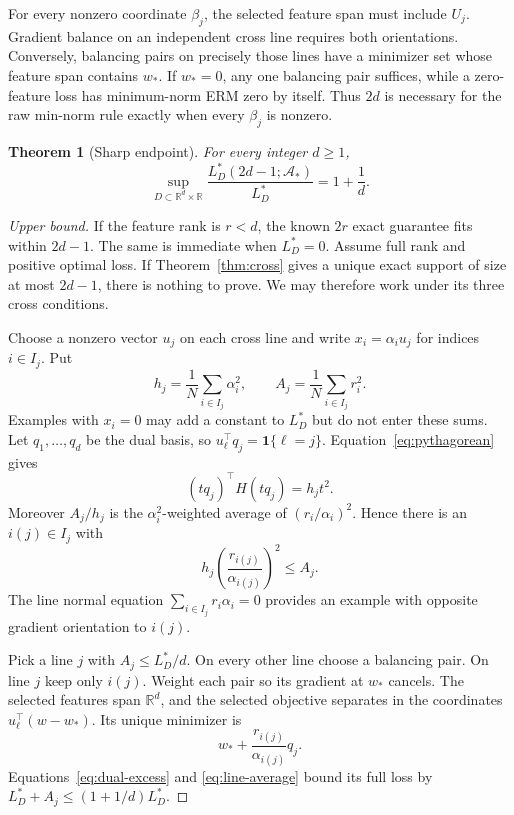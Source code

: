 \documentclass[twoside]{article}
\newtheorem{theorem}{Theorem}
\newcommand{\R}{\mathbb R}
\newcommand{\cA}{\mathcal A}
\begin{document}
For every nonzero coordinate $\beta_j$, the selected feature span must include $U_j$. Gradient balance on an independent cross line requires both orientations. Conversely, balancing pairs on precisely those lines have a minimizer set whose feature span contains $w_*$. If $w_*=0$, any one balancing pair suffices, while a zero-feature loss has minimum-norm ERM zero by itself. Thus $2d$ is necessary for the raw min-norm rule exactly when every $\beta_j$ is nonzero.

\begin{theorem}[Sharp endpoint]
\label{thm:endpoint}
For every integer $d\geq1$,
\begin{equation}
 \sup_{D\subset\R^d\times\R}
 \frac{L_D^*(2d-1;\cA_*)}{L_D^*}=1+\frac1d.
 \label{eq:endpoint}
\end{equation}
\end{theorem}

\begin{proof}[Upper bound]
If the feature rank is $r<d$, the known $2r$ exact guarantee fits within $2d-1$. The same is immediate when $L_D^*=0$. Assume full rank and positive optimal loss. If Theorem~\ref{thm:cross} gives a unique exact support of size at most $2d-1$, there is nothing to prove. We may therefore work under its three cross conditions.

Choose a nonzero vector $u_j$ on each cross line and write $x_i=\alpha_i u_j$ for indices $i\in I_j$. Put
\begin{equation}
 h_j=\frac1N\sum_{i\in I_j}\alpha_i^2,\qquad
 A_j=\frac1N\sum_{i\in I_j}r_i^2.
 \label{eq:line-shares}
\end{equation}
Examples with $x_i=0$ may add a constant to $L_D^*$ but do not enter these sums. Let $q_1,\ldots,q_d$ be the dual basis, so $u_\ell^\top q_j=\mathbf1\{\ell=j\}$. Equation~\eqref{eq:pythagorean} gives
\begin{equation}
 (tq_j)^\top H(tq_j)=h_jt^2.
 \label{eq:dual-excess}
\end{equation}
Moreover $A_j/h_j$ is the $\alpha_i^2$-weighted average of $(r_i/\alpha_i)^2$. Hence there is an $i(j)\in I_j$ with
\begin{equation}
 h_j\left(\frac{r_{i(j)}}{\alpha_{i(j)}}\right)^2\leq A_j.
 \label{eq:line-average}
\end{equation}
The line normal equation $\sum_{i\in I_j}r_i\alpha_i=0$ provides an example with opposite gradient orientation to $i(j)$.

Pick a line $j$ with $A_j\leq L_D^*/d$. On every other line choose a balancing pair. On line $j$ keep only $i(j)$. Weight each pair so its gradient at $w_*$ cancels. The selected features span $\R^d$, and the selected objective separates in the coordinates $u_\ell^\top(w-w_*)$. Its unique minimizer is
\begin{equation}
 w_*+\frac{r_{i(j)}}{\alpha_{i(j)}}q_j.
\end{equation}
Equations~\eqref{eq:dual-excess} and \eqref{eq:line-average} bound its full loss by $L_D^*+A_j\leq(1+1/d)L_D^*$.
\end{proof}
\end{document}

